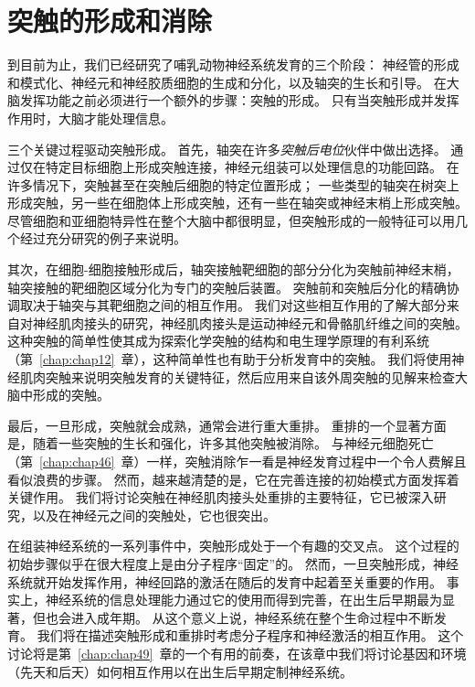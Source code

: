 \chapter{突触的形成和消除} \label{chap:chap48}


到目前为止，我们已经研究了哺乳动物神经系统发育的三个阶段：
神经管的形成和模式化、神经元和神经胶质细胞的生成和分化，以及轴突的生长和引导。
在大脑发挥功能之前必须进行一个额外的步骤：突触的形成。
只有当突触形成并发挥作用时，大脑才能处理信息。


三个关键过程驱动突触形成。
首先，轴突在许多\textit{突触后电位}伙伴中做出选择。
通过仅在特定目标细胞上形成突触连接，神经元组装可以处理信息的功能回路。
在许多情况下，突触甚至在突触后细胞的特定位置形成；
一些类型的轴突在树突上形成突触，另一些在细胞体上形成突触，还有一些在轴突或神经末梢上形成突触。
尽管细胞和亚细胞特异性在整个大脑中都很明显，但突触形成的一般特征可以用几个经过充分研究的例子来说明。


其次，在细胞-细胞接触形成后，轴突接触靶细胞的部分分化为突触前神经末梢，轴突接触的靶细胞区域分化为专门的突触后装置。
突触前和突触后分化的精确协调取决于轴突与其靶细胞之间的相互作用。
我们对这些相互作用的了解大部分来自对神经肌肉接头的研究，神经肌肉接头是运动神经元和骨骼肌纤维之间的突触。
这种突触的简单性使其成为探索化学突触的结构和电生理学原理的有利系统（第~\ref{chap:chap12}~章），这种简单性也有助于分析发育中的突触。
我们将使用神经肌肉突触来说明突触发育的关键特征，然后应用来自该外周突触的见解来检查大脑中形成的突触。


最后，一旦形成，突触就会成熟，通常会进行重大重排。
重排的一个显著方面是，随着一些突触的生长和强化，许多其他突触被消除。
与神经元细胞死亡（第~\ref{chap:chap46}~章）一样，突触消除乍一看是神经发育过程中一个令人费解且看似浪费的步骤。
然而，越来越清楚的是，它在完善连接的初始模式方面发挥着关键作用。
我们将讨论突触在神经肌肉接头处重排的主要特征，它已被深入研究，以及在神经元之间的突触处，它也很突出。


在组装神经系统的一系列事件中，突触形成处于一个有趣的交叉点。
这个过程的初始步骤似乎在很大程度上是由分子程序“固定”的。
然而，一旦突触形成，神经系统就开始发挥作用，神经回路的激活在随后的发育中起着至关重要的作用。
事实上，神经系统的信息处理能力通过它的使用而得到完善，在出生后早期最为显著，但也会进入成年期。
从这个意义上说，神经系统在整个生命过程中不断发育。
我们将在描述突触形成和重排时考虑分子程序和神经激活的相互作用。
这个讨论将是第~\ref{chap:chap49}~章的一个有用的前奏，在该章中我们将讨论基因和环境（先天和后天）如何相互作用以在出生后早期定制神经系统。



